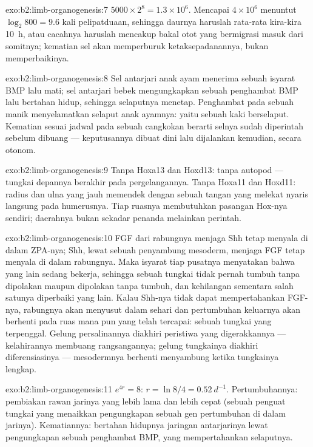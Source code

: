 \begin{solution}{exo:b2:limb-organogenesis:7}
$5000\times 2^{8} = 1.3\times 10^{6}$. Mencapai $4\times 10^{6}$
menuntut $\log_2 800 = 9.6$ kali pelipatduaan, sehingga daurnya
haruslah rata-rata kira-kira \qty{10}{h}, atau cacahnya haruslah
mencakup bakal otot yang bermigrasi masuk dari somitnya; kematian sel
akan memperburuk ketaksepadanannya, bukan memperbaikinya.
\end{solution}

\begin{solution}{exo:b2:limb-organogenesis:8}
Sel antarjari anak ayam menerima sebuah isyarat BMP lalu mati; sel
antarjari bebek mengungkapkan sebuah penghambat BMP lalu bertahan
hidup, sehingga selaputnya menetap. Penghambat pada sebuah manik
menyelamatkan selaput anak ayamnya: yaitu sebuah kaki berselaput.
Kematian sesuai jadwal pada sebuah cangkokan berarti selnya sudah
diperintah sebelum dibuang --- keputusannya dibuat dini lalu dijalankan
kemudian, secara otonom.
\end{solution}

\begin{solution}{exo:b2:limb-organogenesis:9}
Tanpa Hoxa13 dan Hoxd13: tanpa autopod --- tungkai depannya berakhir
pada pergelangannya. Tanpa Hoxa11 dan Hoxd11: radius dan ulna yang jauh
memendek dengan sebuah tangan yang melekat nyaris langsung pada
humerusnya. Tiap ruasnya membutuhkan pasangan Hox-nya sendiri;
daerahnya bukan sekadar penanda melainkan perintah.
\end{solution}

\begin{solution}{exo:b2:limb-organogenesis:10}
FGF dari rabungnya menjaga Shh tetap menyala di dalam ZPA-nya; Shh,
lewat sebuah penyambung mesoderm, menjaga FGF tetap menyala di dalam
rabungnya. Maka isyarat tiap pusatnya menyatakan bahwa yang lain sedang
bekerja, sehingga sebuah tungkai tidak pernah tumbuh tanpa dipolakan
maupun dipolakan tanpa tumbuh, dan kehilangan sementara salah satunya
diperbaiki yang lain. Kalau Shh-nya tidak dapat mempertahankan FGF-nya,
rabungnya akan menyusut dalam sehari dan pertumbuhan keluarnya akan
berhenti pada ruas mana pun yang telah tercapai: sebuah tungkai yang
terpenggal. Gelung persalinannya diakhiri peristiwa yang
digerakkannya --- kelahirannya membuang rangsangannya; gelung
tungkainya diakhiri diferensiasinya --- mesodermnya berhenti menyambung
ketika tungkainya lengkap.
\end{solution}

\begin{solution}{exo:b2:limb-organogenesis:11}
$e^{4r} = 8$: $r = \ln 8/4 = \qty{0.52}{d^{-1}}$. Pertumbuhannya:
pembiakan rawan jarinya yang lebih lama dan lebih cepat (sebuah penguat
tungkai yang menaikkan pengungkapan sebuah gen pertumbuhan di dalam
jarinya). Kematiannya: bertahan hidupnya jaringan antarjarinya lewat
pengungkapan sebuah penghambat BMP, yang mempertahankan selaputnya.
\end{solution}

